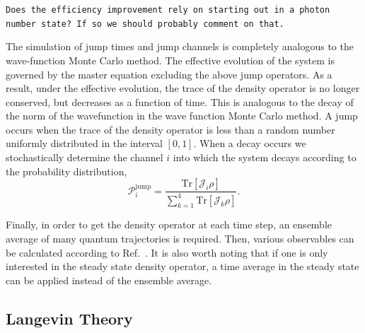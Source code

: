 \documentclass[aps,prl,twocolumn,
superscriptaddress,groupedaddress]{revtex4}
\newcommand{\dmcomment}[1]{{\tt #1}}
\begin{document}
\dmcomment{Does the efficiency improvement rely on starting out in
a photon number state? If so we should probably comment on that.}

The simulation of jump times and jump channels is completely analogous
to the wave-function Monte Carlo method. The effective evolution of the
system is governed by the master equation excluding the above jump
operators. As a result, under the effective evolution, the trace of the
density operator is no longer conserved, but decreases as a function of
time.  This is analogous to the decay of the norm of the wavefunction in
the wave function Monte Carlo method. A jump occurs when the trace of
the density operator is less than a random number uniformly distributed
in the interval $[0,1]$. When a decay occurs we stochastically determine
the channel $i$ into which the system decays according to the
probability distribution,
\begin{equation}
\mathcal{P}_i^{\mathrm{jump}}=\frac{\mathrm{Tr}[\mathcal{J}_i\rho]}{\sum_{k=1}^4
\mathrm{Tr}[\mathcal{J}_k\rho]}.
\end{equation}

Finally, in order to get the density operator at each time step, an
ensemble average of many quantum trajectories is required. Then, various
observables can be calculated according to Ref.~\cite{Holland13}. It is
also worth noting that if one is only interested in the steady state
density operator, a time average in the steady state can be applied
instead of the ensemble average.


\subsection{Langevin Theory}
\end{document}

